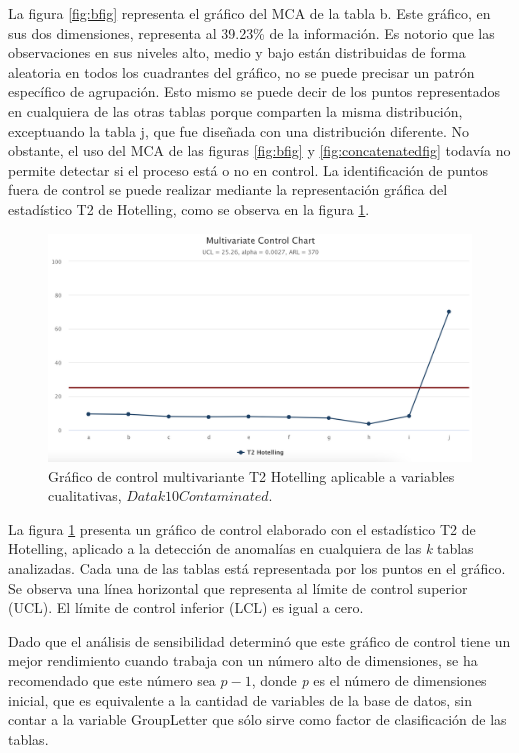 \documentclass[mathematics,article,submit,moreauthors,pdftex]{mdpi}
\begin{document}
La figura \ref{fig:bfig} representa el gráfico del MCA de la tabla b.
Este gráfico, en sus dos dimensiones, representa al 39.23\% de la
información. Es notorio que las observaciones en sus niveles alto, medio
y bajo están distribuidas de forma aleatoria en todos los cuadrantes del
gráfico, no se puede precisar un patrón específico de agrupación. Esto
mismo se puede decir de los puntos representados en cualquiera de las
otras tablas porque comparten la misma distribución, exceptuando la
tabla j, que fue diseñada con una distribución diferente. No obstante,
el uso del MCA de las figuras \ref{fig:bfig} y \ref{fig:concatenatedfig}
todavía no permite detectar si el proceso está o no en control. La
identificación de puntos fuera de control se puede realizar mediante la
representación gráfica del estadístico T2 de Hotelling, como se observa
en la figura \ref{fig:tdos}.

\begin{figure}[H]


\begin{center}\includegraphics[width=0.9\linewidth,]{t2} \end{center}

\caption{Gráfico de control multivariante T2 Hotelling aplicable a variables cualitativas, $Datak10Contaminated$.}

\label{fig:tdos}
\end{figure}

La figura \ref{fig:tdos} presenta un gráfico de control elaborado con el
estadístico T2 de Hotelling, aplicado a la detección de anomalías en
cualquiera de las \emph{k} tablas analizadas. Cada una de las tablas
está representada por los puntos en el gráfico. Se observa una línea
horizontal que representa al límite de control superior (UCL). El límite
de control inferior (LCL) es igual a cero.

Dado que el análisis de sensibilidad determinó que este gráfico de
control tiene un mejor rendimiento cuando trabaja con un número alto de
dimensiones, se ha recomendado que este número sea \(p-1\), donde
\emph{p} es el número de dimensiones inicial, que es equivalente a la
cantidad de variables de la base de datos, sin contar a la variable
GroupLetter que sólo sirve como factor de clasificación de las tablas.
\end{document}
